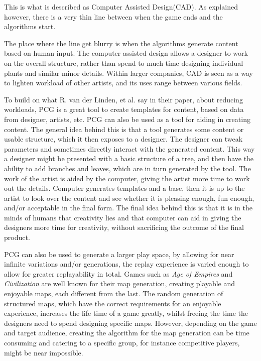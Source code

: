 This is what is described as Computer Assisted Design(CAD)\cite{book:cad}. As explained however, there is a very thin line between when the game ends and the algorithms start. 

The place where the line get blurry is when the algorithms generate content based on human input. The computer assisted design allows a designer to work on the overall structure, rather than spend to much time designing individual plants and similar minor details.
Within larger companies, CAD is seen as a way to lighten workload of other artists, and its uses range between various fields.

To build on what R. van der Linden, et al. say in their paper, about reducing workloads, PCG is a great tool to create templates for content, based on data from designer, artists, etc. PCG can also be used as a tool for aiding in creating content.
The general idea behind this is that a tool generates some content or usable structure, which it then exposes to a designer. The designer can tweak parameters and sometimes directly interact with the generated content. This way a designer might be presented with a basic structure of a tree, and then have the ability to add branches and leaves, which are in turn generated by the tool. 
The work of the artist is aided by the computer, giving the artist more time to work out the details. Computer generates templates and a base, then it is up to the artist to look over the content and see whether it is pleasing enough, fun enough, and/or acceptable in the final form. The final idea behind this is that it is in the minds of humans that creativity lies and that computer can aid in giving the designers more time for creativity, without sacrificing the outcome of the final product. 

PCG can also be used to generate a larger play space, by allowing for near infinite variations and/or generations, the replay experience is varied enough to allow for greater replayability in total. Games such as \textit{Age of Empires} and \textit{Civilization} are well known for their map generation, creating playable and enjoyable maps, each different from the last. 
The random generation of structured maps, which have the correct requirements for an enjoyable experience, increases the life time of a game greatly, whilst freeing the time the designers need to spend designing specific maps. However, depending on the game and target audience, creating the algorithm for the map generation can be time consuming and catering to a specific group, for instance competitive players, might be near impossible.

